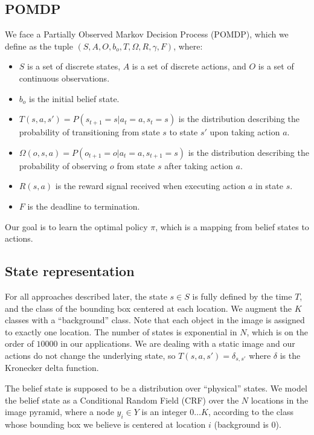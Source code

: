 \subsection{POMDP}
We face a Partially Observed Markov Decision Process (POMDP), which we define as the tuple $(S,A,O,b_o,T,\Omega,R,\gamma,F)$, where:
\begin{itemize}
  \item $S$ is a set of discrete states, $A$ is a set of discrete actions, and $O$ is a set of continuous observations.
  \item $b_o$ is the initial belief state.
  \item $T(s,a,s') = P(s_{t+1} = s | a_t = a, s_t = s)$ is the distribution describing the probability of transitioning from state $s$ to state $s'$ upon taking action $a$.
  \item $\Omega(o,s,a) = P(o_{t+1}=o | a_t = a, s_{t+1} = s)$ is the distribution describing the probability of observing $o$ from state $s$ after taking action $a$.
  \item $R(s,a)$ is the reward signal received when executing action $a$ in state $s$.
  \item $F$ is the deadline to termination.
\end{itemize}
Our goal is to learn the optimal policy $\pi$, which is a mapping from belief states to actions.

\subsection{State representation}
For all approaches described later, the state $s \in S$ is fully defined by the time $T$, and the class of the bounding box centered at each location.
We augment the $K$ classes with a ``background'' class.
Note that each object in the image is assigned to exactly one location.
The number of states is exponential in $N$, which is on the order of $10000$ in our applications.
We are dealing with a static image and our actions do not change the underlying state, so $T(s,a,s') = \delta_{s, s'}$ where $\delta$ is the Kronecker delta function.

The belief state is supposed to be a distribution over ``physical'' states.
We model the belief state as a Conditional Random Field (CRF) over the $N$ locations in the image pyramid, where a node $y_{i} \in Y$ is an integer $0 \dots K$, according to the class whose bounding box we believe is centered at location $i$ (background is $0$).

